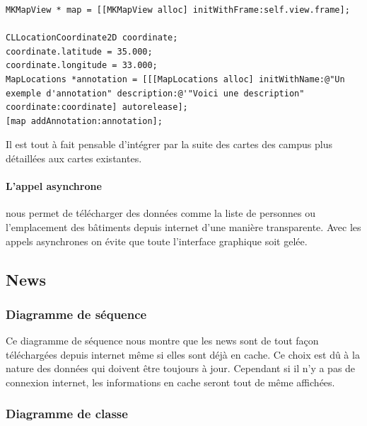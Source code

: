 			\lstset{
			    style = Xcode,
			    caption=Code de création d'un objet MKMapView et l'ajout d'une annotation.,
			    breaklines=true,
			    frame=single
			}

\begin{lstlisting}[name=MapView with label  , label=MKMapView]
MKMapView * map = [[MKMapView alloc] initWithFrame:self.view.frame];

CLLocationCoordinate2D coordinate;
coordinate.latitude = 35.000;
coordinate.longitude = 33.000;            
MapLocations *annotation = [[[MapLocations alloc] initWithName:@"Un exemple d'annotation" description:@'"Voici une description" coordinate:coordinate] autorelease];
[map addAnnotation:annotation];
\end{lstlisting}
		Il est tout à fait pensable d'intégrer par la suite des cartes des campus plus détaillées aux cartes existantes. 
		
		\paragraph{L'appel asynchrone} nous permet de télécharger des données comme la liste de personnes ou l'emplacement des bâtiments depuis internet d'une manière transparente. Avec les appels asynchrones on évite que toute l'interface graphique soit gelée.


	\subsection{News}
			\subsubsection*{Diagramme de séquence}
				Ce diagramme de séquence nous montre que les news sont de tout façon téléchargées depuis internet même si elles sont déjà en cache. Ce choix est dû à la nature des données qui doivent être toujours à jour. Cependant si il n'y a pas de connexion internet, les informations en cache seront tout de même affichées. 
			\subsubsection*{Diagramme de classe}
